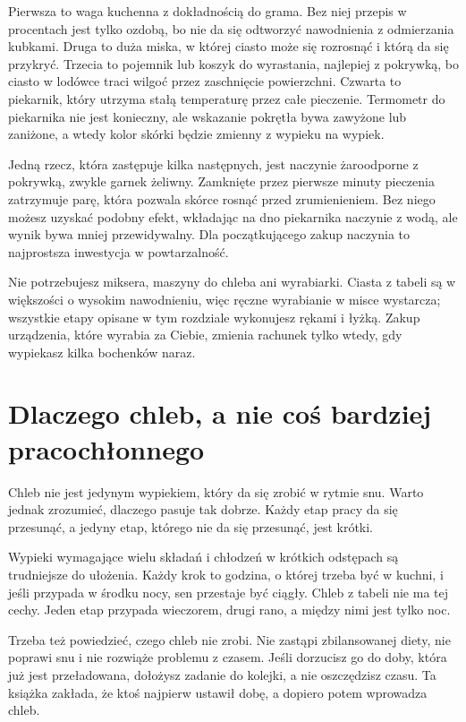 Pierwsza to waga kuchenna z dokładnością do grama. Bez niej przepis w procentach jest tylko ozdobą, bo nie da się odtworzyć nawodnienia z odmierzania kubkami. Druga to duża miska, w której ciasto może się rozrosnąć i którą da się przykryć. Trzecia to pojemnik lub koszyk do wyrastania, najlepiej z pokrywką, bo ciasto w lodówce traci wilgoć przez zaschnięcie powierzchni. Czwarta to piekarnik, który utrzyma stałą temperaturę przez całe pieczenie. Termometr do piekarnika nie jest konieczny, ale wskazanie pokrętła bywa zawyżone lub zaniżone, a wtedy kolor skórki będzie zmienny z wypieku na wypiek.

Jedną rzecz, która zastępuje kilka następnych, jest naczynie żaroodporne z pokrywką, zwykle garnek żeliwny. Zamknięte przez pierwsze minuty pieczenia zatrzymuje parę, która pozwala skórce rosnąć przed zrumienieniem. Bez niego możesz uzyskać podobny efekt, wkładając na dno piekarnika naczynie z wodą, ale wynik bywa mniej przewidywalny. Dla początkującego zakup naczynia to najprostsza inwestycja w powtarzalność.

Nie potrzebujesz miksera, maszyny do chleba ani wyrabiarki. Ciasta z tabeli są w większości o wysokim nawodnieniu, więc ręczne wyrabianie w misce wystarcza; wszystkie etapy opisane w tym rozdziale wykonujesz rękami i łyżką. Zakup urządzenia, które wyrabia za Ciebie, zmienia rachunek tylko wtedy, gdy wypiekasz kilka bochenków naraz.

\section{Dlaczego chleb, a nie coś bardziej pracochłonnego}

Chleb nie jest jedynym wypiekiem, który da się zrobić w rytmie snu. Warto jednak zrozumieć, dlaczego pasuje tak dobrze. Każdy etap pracy da się przesunąć, a jedyny etap, którego nie da się przesunąć, jest krótki.

Wypieki wymagające wielu składań i chłodzeń w krótkich odstępach są trudniejsze do ułożenia. Każdy krok to godzina, o której trzeba być w kuchni, i jeśli przypada w środku nocy, sen przestaje być ciągły. Chleb z tabeli nie ma tej cechy. Jeden etap przypada wieczorem, drugi rano, a między nimi jest tylko noc.

Trzeba też powiedzieć, czego chleb nie zrobi. Nie zastąpi zbilansowanej diety, nie poprawi snu i nie rozwiąże problemu z czasem. Jeśli dorzucisz go do doby, która już jest przeładowana, dołożysz zadanie do kolejki, a nie oszczędzisz czasu. Ta książka zakłada, że ktoś najpierw ustawił dobę, a dopiero potem wprowadza chleb.

